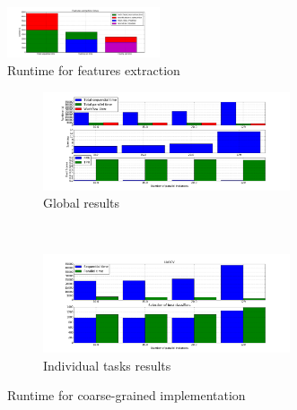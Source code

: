 \documentclass[10pt, conference, compsocconf]{IEEEtran}
\begin{document}
\begin{figure}[h]
  \centering
  \includegraphics[width=0.4\textwidth]{Figures/times_extraction.png}
  \caption{Runtime for features extraction \label{fig:times_extraction}}
\end{figure}

\begin{figure}[h]
  \begin{center}
    \begin{subfigure}{0.5\textwidth}
      \captionsetup{skip=-1pt}
      \centering
      \includegraphics[width=0.8\textwidth]{Figures/times_fixedparams_global_bars.png}
      \caption{\footnotesize Global results \label{subfig:granularity_glob}}
    \end{subfigure}\\
  \begin{subfigure}{0.5\textwidth}
    \captionsetup{skip=-1pt}
    \centering
    \includegraphics[width=0.8\textwidth]{Figures/times_fixedparams_individual_bars.png}
    \caption{\footnotesize Individual tasks results \label{subfig:granularity_ind}}
  \end{subfigure}
\end{center}
\caption{Runtime for coarse-grained implementation \label{fig:granularity}}
\end{figure}
\end{document}
